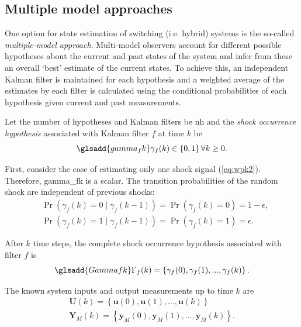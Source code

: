 \subsection{Multiple model approaches}

One option for state estimation of switching (i.e. hybrid) systems is the so-called \textit{multiple-model approach}. Multi-model observers account for different possible hypotheses about the current and past states of the system and infer from these an overall `best' estimate of the current states. To achieve this, an independent Kalman filter is maintained for each hypothesis and a weighted average of the estimates by each filter is calculated using the conditional probabilities of each hypothesis given current and past measurements.

Let the number of hypotheses and Kalman filters be \gls{nh} and the \textit{shock occurrence hypothesis} associated with Kalman filter $f$ at time $k$ be
\begin{equation} \label{eq:gammak} \glsadd{gamma_fk}
	\gamma_{f}(k) \in \left\{0, 1 \right\} \forall{k \ge 0}.
\end{equation}

First, consider the case of estimating only one shock signal (\ref{eq:wpk2}). Therefore, \gls{gamma_fk} is a scalar. The transition probabilities of the random shock are independent of previous shocks:
\begin{equation} \label{eq:Pr_gammak_given_gammakm1}
	\begin{aligned}
		& \Pr\left(\gamma_{f}(k)=0 \mid \gamma_{f}(k-1)\right) = \Pr\left(\gamma_{f}(k)=0\right) = 1-\epsilon, \\
		& \Pr\left(\gamma_{f}(k)=1 \mid \gamma_{f}(k-1)\right) = \Pr\left(\gamma_{f}(k)=1\right) = \epsilon.
	\end{aligned}
\end{equation}

After $k$ time steps, the complete shock occurrence hypothesis associated with filter $f$ is
\begin{equation} \label{eq:Gammak} \glsadd{Gammafk}
	\Gamma_f(k) = \left\{ \gamma_f(0), \gamma_f(1), ..., \gamma_f(k) \right\}.
\end{equation}

The known system inputs and output measurements up to time $k$ are
\begin{equation} \label{eq:Uk_Yk}
	\begin{aligned}
		\mathbf{U}(k) = \left\{ \mathbf{u}(0), \mathbf{u}(1), ..., \mathbf{u}(k) \right\} \\
		\mathbf{Y}_M(k) = \left\{ \mathbf{y}_M(0), \mathbf{y}_M(1), ..., \mathbf{y}_M(k) \right\}.
	\end{aligned}
\end{equation}

